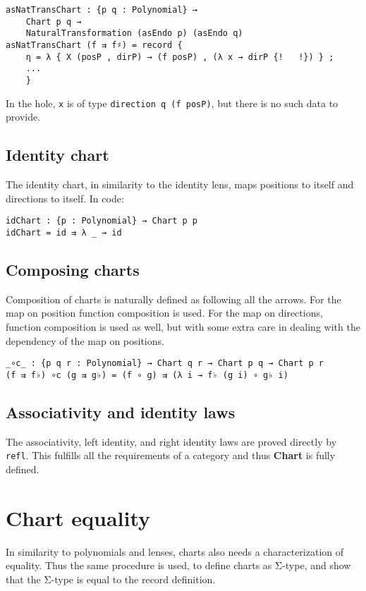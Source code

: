 \begin{verbatim}
asNatTransChart : {p q : Polynomial} → 
    Chart p q → 
    NaturalTransformation (asEndo p) (asEndo q)
asNatTransChart (f ⇉ f♯) = record { 
    η = λ { X (posP , dirP) → (f posP) , (λ x → dirP {!   !}) } ; 
    ... 
    }
\end{verbatim}
In the hole, \texttt{x} is of type \texttt{direction q (f posP)}, but there is no such data to provide. 

\subsection{Identity chart}
The identity chart, in similarity to the identity lens, maps positions to itself and directions to itself. In code:

\begin{verbatim}
idChart : {p : Polynomial} → Chart p p
idChart = id ⇉ λ _ → id
\end{verbatim}

\subsection{Composing charts}
Composition of charts is naturally defined as following all the arrows. For the map on position function composition is used. For the map on directions, function composition is used as well, but with some extra care in dealing with the dependency of the map on positions. 
\begin{verbatim}
_∘c_ : {p q r : Polynomial} → Chart q r → Chart p q → Chart p r
(f ⇉ f♭) ∘c (g ⇉ g♭) = (f ∘ g) ⇉ (λ i → f♭ (g i) ∘ g♭ i)
\end{verbatim}

\subsection{Associativity and identity laws}
The associativity, left identity, and right identity laws are proved directly by \texttt{refl}. This fulfills all the requirements of a category and thus \textbf{Chart} is fully defined.


\section{Chart equality}
In similarity to polynomials and lenses, charts also needs a characterization of equality. Thus the same procedure is used, to define charts as Σ-type, and show that the Σ-type is equal to the record definition.

